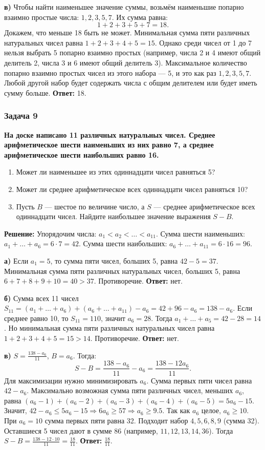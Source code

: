 \documentclass[12pt, a4paper]{article}
\begin{document}
\textbf{в)} Чтобы найти наименьшее значение суммы, возьмём наименьшие попарно взаимно простые числа: $1, 2, 3, 5, 7$. Их сумма равна:
\[
1 + 2 + 3 + 5 + 7 = 18.
\]
Докажем, что меньше 18 быть не может. 
Минимальная сумма пяти различных натуральных чисел равна \(1+2+3+4+5 = 15\). Однако среди чисел от 1 до 7 нельзя выбрать 5 попарно взаимно простых (например, числа 2 и 4 имеют общий делитель 2, числа 3 и 6 имеют общий делитель 3). Максимальное количество попарно взаимно простых чисел из этого набора — 5, и это как раз \(1, 2, 3, 5, 7\). Любой другой набор будет содержать числа с общим делителем или будет иметь сумму больше.
\textbf{Ответ:} 18.

\subsubsection*{Задача 9}
\textbf{На доске написано 11 различных натуральных чисел. Среднее арифметическое шести наименьших из них равно 7, а среднее арифметическое шести наибольших равно 16.}
\begin{enumerate}[label=\alph*)]
    \item Может ли наименьшее из этих одиннадцати чисел равняться 5?
    \item Может ли среднее арифметическое всех одиннадцати чисел равняться 10?
    \item Пусть $B$ — шестое по величине число, а $S$ — среднее арифметическое всех одиннадцати чисел. Найдите наибольшее значение выражения $S - B$.
\end{enumerate}

\textbf{Решение:}
Упорядочим числа: \(a_1 < a_2 < \dots < a_{11}\).
Сумма шести наименьших: \(a_1 + \dots + a_6 = 6 \cdot 7 = 42\).
Сумма шести наибольших: \(a_6 + \dots + a_{11} = 6 \cdot 16 = 96\).

\textbf{а)} Если \(a_1 = 5\), то сумма пяти чисел, больших 5, равна \(42 - 5 = 37\). Минимальная сумма пяти различных натуральных чисел, больших 5, равна \(6+7+8+9+10 = 40 > 37\). Противоречие.
\textbf{Ответ:} нет.

\textbf{б)} Сумма всех 11 чисел \(S_{11} = (a_1 + \dots + a_6) + (a_6 + \dots + a_{11}) - a_6 = 42 + 96 - a_6 = 138 - a_6\).
Если среднее равно 10, то \(S_{11} = 110\), значит \(a_6 = 28\).
Тогда \(a_1 + \dots + a_5 = 42 - 28 = 14\). Но минимальная сумма пяти различных натуральных чисел равна \(1+2+3+4+5 = 15 > 14\). Противоречие.
\textbf{Ответ:} нет.

\textbf{в)} \(S = \frac{138 - a_6}{11}\), \(B = a_6\). Тогда:
\[
S - B = \frac{138 - a_6}{11} - a_6 = \frac{138 - 12a_6}{11}.
\]
Для максимизации нужно минимизировать \(a_6\). 
Сумма первых пяти чисел равна \(42 - a_6\). Максимально возможная сумма пяти различных чисел, меньших \(a_6\), равна \((a_6-1) + (a_6-2) + (a_6-3) + (a_6-4) + (a_6-5) = 5a_6 - 15\).
Значит, \(42 - a_6 \le 5a_6 - 15 \Rightarrow 6a_6 \ge 57 \Rightarrow a_6 \ge 9.5\). Так как \(a_6\) целое, \(a_6 \ge 10\).
При \(a_6 = 10\) сумма первых пяти равна 32. Подходит набор \(4, 5, 6, 8, 9\) (сумма 32). Оставшиеся 5 чисел дают в сумме 86 (например, \(11, 12, 13, 14, 36\)).
Тогда \(S - B = \frac{138 - 12 \cdot 10}{11} = \frac{18}{11}\).
\textbf{Ответ:} \(\frac{18}{11}\).
\end{document}
